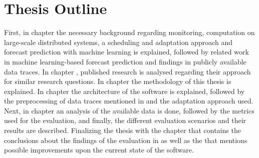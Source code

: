         
        \section{Thesis Outline}
        \label{sec:thesis-outline-introduction}

            First, in chapter  the necessary background regarding monitoring, computation on large-scale distributed systems, a scheduling and adaptation approach and forecast prediction with machine learning is explained, followed by related work in machine learning-based forecast prediction and findings in publicly available data traces.
            In chapter , published research is analysed regarding their approach for similar research questions.
            In chapter  the methodology of this thesis is explained. 
            In chapter  the architecture of the software is explained, followed by the preprocessing of data traces mentioned in  and the adaptation approach used.
            Next, in chapter  an analysis of the available data is done, followed by the metrics used for the evaluation, and finally, the different evaluation scenarios and their results are described.
            Finalizing the thesis with the chapter  that contains the conclusions about the findings of the evaluation in  as well as the  that mentions possible improvements upon the current state of the software.


